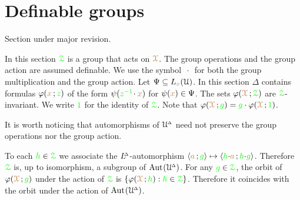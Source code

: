 \section{Definable groups}\label{definablegroups}

\def\medrel#1{\parbox[t]{5ex}{$\displaystyle\hfil #1$}}
\def\ceq#1#2#3{\parbox[t]{25ex}{$\displaystyle #1$}\medrel{#2}{$\displaystyle #3$}}

\noindent\llap{\textcolor{red}{\Large\warning}\kern1.5ex}\ignorespaces
Section under major revision.

In this section $\grZ$ is a group that acts on $\mrX$.
The group operations and the group action are assumed definable.
We use the symbol $\,\cdot\,$ for both the group multiplication and the group action.
Let $\Psi\subseteq L_{\mr x}(\U)$.
In this section $\Delta$ contains formulas $\phi({\mr x}\,;{\gr z})$ of the form  $\psi({\gr z^{-1}}\!\cdot{\mr x})$ for $\psi({\mr x})\in\Psi$.
The sets $\phi(\mrX\,;\grZ)$ are $\grZ$-invariant.
We write ${\gr 1}$ for the identity of $\grZ$.
Note that $\phi(\mrX\,;{\gr g})={\gr g}\cdot\phi(\mrX\,;{\gr 1})$.

It is worth noticing that automorphisms of $\UDelta$ need not preserve the group operations nor the group action.

To each ${\gr h}\in\grZ$ we associate the $\LDelta$-automorphism $\<{\mr a}\,;{\gr g}\>\mapsto\<{\gr h}{\cdot}{\mr a}\,;{\gr h}{\cdot}{\gr g}\>$.
Therefore $\grZ$ is, up to isomorphism, a subgroup of $\Aut(\UDelta)$.
For any ${\gr g}\in\grZ$, the orbit of $\phi(\mrX\,;{\gr g})$ under the action of $\grZ$ is $\{\phi(\mrX\,;{\gr h}) : {\gr h}\in\grZ\}$.
Therefore it coincides with the orbit under the action of $\Aut(\UDelta)$.




